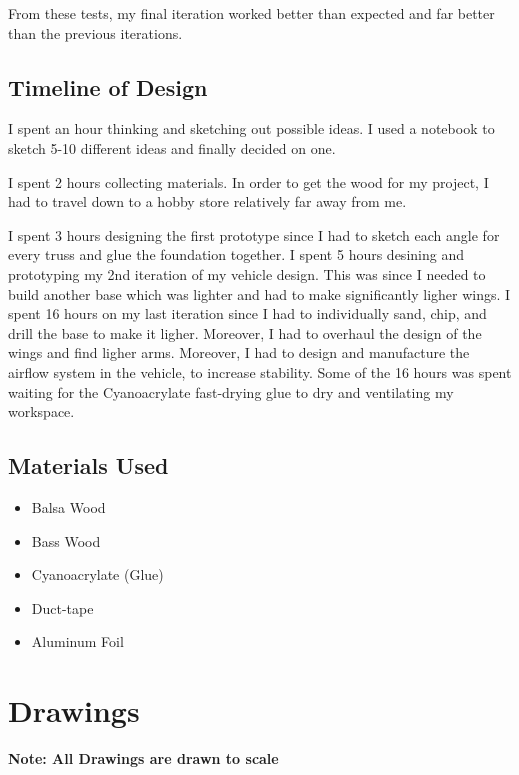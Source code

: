 \documentclass[12pt]{report}
\begin{document}
From these tests, my final iteration worked better than expected and far better than the previous iterations.


\section{Timeline of Design}
I spent an hour thinking and sketching out possible ideas. I used a notebook to sketch 5-10 different ideas and finally decided on one. 

I spent 2 hours collecting materials. In order to get the wood for my project, I had to travel down to a hobby store relatively far away from me.

I spent 3 hours designing the first prototype since I had to sketch each angle for every truss and glue the foundation together. I spent 5 hours desining and prototyping my 2nd iteration of my vehicle design. This was since I needed to build another base which was lighter and had to make significantly ligher wings. I spent 16 hours on my last iteration since I had to individually sand, chip, and drill the base to make it ligher. Moreover, I had to overhaul the design of the wings and find ligher arms. Moreover, I had to design and manufacture the airflow system in the vehicle, to increase stability. Some of the 16 hours was spent waiting for the Cyanoacrylate fast-drying glue to dry and ventilating my workspace.


\section{Materials Used}
\begin{itemize}
  \item Balsa Wood
  \item Bass Wood
  \item Cyanoacrylate (Glue)
  \item Duct-tape
  \item Aluminum Foil
\end{itemize}







\chapter{Drawings}
\textbf{Note: All Drawings are drawn to scale}
\end{document}
